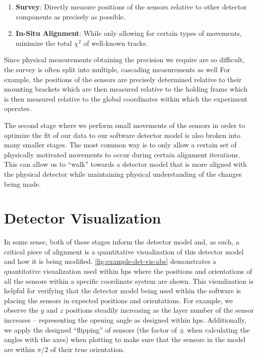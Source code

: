 \begin{enumerate}
  \item \textbf{Survey}: Directly measure positions of the sensors relative to other
        detector components as precisely as possible.
  \item \textbf{In-Situ Alignment}: While only allowing for certain types of movements,
        minimize the total $\chi^2$ of well-known tracks.
\end{enumerate}

Since physical measurements obtaining the precision we require are so difficult, the survey is
often split into multiple, cascading measurements as well For example, the positions of the sensors
are precisely determined relative to their mounting brackets which are then measured relative to
the holding frame which is then measured relative to the global coordinates within which the
experiment operates.

The second stage where we perform small movements of the sensors in order to optimize the fit of
our data to our software detector model is also broken into many smaller stages. The most common
way is to only allow a certain set of physically motivated movements to occur during certain
alignment iterations. This can allow us to ``walk'' towards a detector model that is more aligned
with the physical detector while maintaining physical understanding of the changes being made.

\section{Detector Visualization}

In some sense, both of these stages inform the detector model and, as such, a critical piece of
alignment is a quantitative visualization of this detector model and how it is being modified.
\cref{fig:example-det-vis-abs} demonstrates a quantitative visualization used within \ac{hps} where
the positions and orientations of all the sensors within a specific coordinate system are shown.
This visualization is helpful for verifying that the detector model being used within the software
is placing the sensors in expected positions and orientations. For example, we observe the $y$ and
$z$ positions steadily increasing as the layer number of the sensor increases -- representing the
opening angle as designed within \ac{hps}. Additionally, we apply the designed ``flipping'' of
sensors (the factor of $\pm$ when calculating the angles with the axes)
when plotting to make sure that the sensors in the model are within $\pi/2$ of their true orientation.

